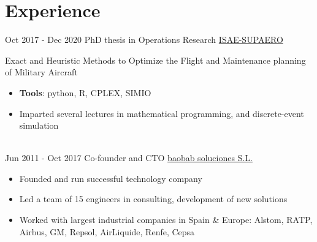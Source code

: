 \documentclass[letterpaper]{twentysecondcv} %
\begin{document}
\makeprofile %


\section{Experience}

\begin{twenty} %
\twentyitem
    	{Oct 2017 -}
		{Dec 2020}
        {PhD thesis in Operations Research}
        {\href{https://www.isae-supaero.fr/en/}{ISAE-SUPAERO}}
        {}
        {Exact and Heuristic Methods to Optimize the Flight and Maintenance planning of Military Aircraft
        {\begin{itemize}
                \item \textbf{Tools}: python, R, CPLEX, SIMIO
                \item Imparted several lectures in mathematical programming, and discrete-event simulation
                \end{itemize}}}
        \\
	\twentyitem
    	{Jun 2011 -}
		{Oct 2017}
        {Co-founder and CTO}
        {\href{https://baobabsoluciones.es/en/}{baobab soluciones S.L.}}
        {}
        {
        {\begin{itemize}
        \item Founded and run successful technology company
        \item Led a team of 15 engineers in consulting, development of new solutions
        \item Worked with largest industrial companies in Spain \&  Europe: Alstom, RATP, Airbus, GM, Repsol, AirLiquide, Renfe, Cepsa
        \end{itemize}}
        }        
\end{twenty}

\vspace{-0.5cm}
\end{document}
